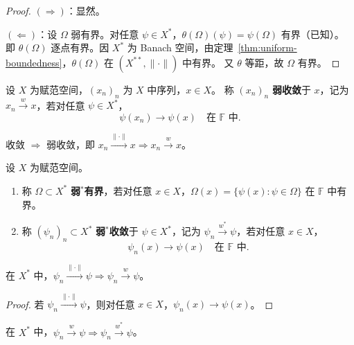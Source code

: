 \documentclass[lang=cn,a4paper,newtx,section]{elegantbook}
\begin{document}
\begin{proof}
  $(\Rightarrow)$：显然。

  $(\Leftarrow)$：设 $\Omega$ 弱有界。对任意 $\psi\in X^*$，$\theta(\Omega)(\psi)=\psi(\Omega)$ 有界（已知）。
  即 $\theta(\Omega)$ 逐点有界。因 $X^*$ 为 Banach 空间，由定理~\ref{thm:uniform-boundedness}，$\theta(\Omega)$ 在 $(X^{**},\|\cdot\|)$ 中有界。
  又 $\theta$ 等距，故 $\Omega$ 有界。
\end{proof}

\begin{definition}[弱收敛]
  设 $X$ 为赋范空间，$(x_n)_n$ 为 $X$ 中序列，$x\in X$。
  称 $(x_n)_n$ \textbf{弱收敛}于 $x$，记为 $x_n\xrightarrow{w}x$，若对任意 $\psi\in X^*$，
  \[
    \psi(x_n)\to\psi(x)\quad\text{在 }\mathbb{F}\text{ 中}.
  \]
\end{definition}

\begin{proposition}
  收敛 $\Rightarrow$ 弱收敛，即 $x_n\xrightarrow{\|\cdot\|}x\Rightarrow x_n\xrightarrow{w}x$。
\end{proposition}

\begin{definition}[弱$^*$有界与弱$^*$收敛]
  设 $X$ 为赋范空间。
  \begin{enumerate}
    \item 称 $\Omega\subset X^*$ \textbf{弱$^*$有界}，若对任意 $x\in X$，$\Omega(x)=\{\psi(x):\psi\in\Omega\}$ 在 $\mathbb{F}$ 中有界。
    \item 称 $(\psi_n)_n\subset X^*$ \textbf{弱$^*$收敛}于 $\psi\in X^*$，记为 $\psi_n\xrightarrow{w^*}\psi$，若对任意 $x\in X$，
    \[
      \psi_n(x)\to\psi(x)\quad\text{在 }\mathbb{F}\text{ 中}.
    \]
  \end{enumerate}
\end{definition}

\begin{proposition}
  在 $X^*$ 中，$\psi_n\xrightarrow{\|\cdot\|}\psi\Rightarrow\psi_n\xrightarrow{w}\psi$。
\end{proposition}

\begin{proof}
  若 $\psi_n\xrightarrow{\|\cdot\|}\psi$，则对任意 $x\in X$，$\psi_n(x)\to\psi(x)$。
\end{proof}

\begin{proposition}
  在 $X^*$ 中，$\psi_n\xrightarrow{w}\psi\Rightarrow\psi_n\xrightarrow{w^*}\psi$。
\end{proposition}
\end{document}
